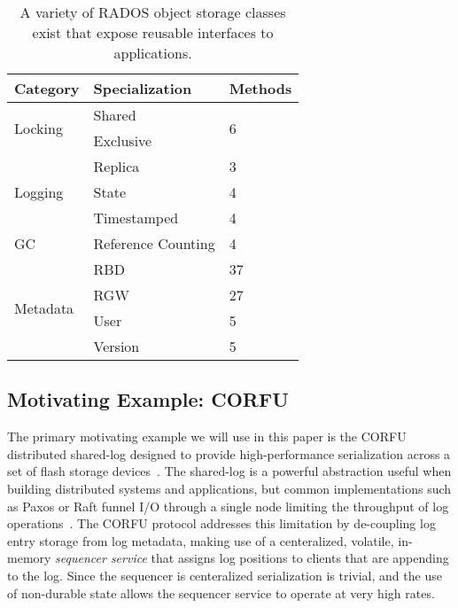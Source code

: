 \documentclass[10pt,twocolumn]{article}
\begin{document}
\begin{table}
\begin{tabular}{|l|l|l|}
\hline
Category & Specialization & Methods \\ \hline
\multirow{2}{*}{Locking} & Shared & \multirow{2}{*}{6} \\
                         & Exclusive & \\ \hline
\multirow{3}{*}{Logging} & Replica & 3 \\
                         & State & 4 \\
                         & Timestamped & 4 \\ \hline
GC & Reference Counting & 4 \\ \hline
\multirow{4}{*}{Metadata} & RBD & 37 \\
 & RGW & 27 \\
 & User & 5 \\
 & Version & 5 \\ \hline
\end{tabular}
\caption{A variety of RADOS object storage classes exist that expose reusable
interfaces to applications.}
\label{tab:objclass-cats}
\end{table}

\subsection{Motivating Example: CORFU}

The primary motivating example we will use in this paper is the CORFU
distributed shared-log designed to provide high-performance serialization
across a set of flash storage devices~\cite{balakrishnan:nsdi12}. The
shared-log is a powerful abstraction useful when building distributed systems
and applications, but common implementations such as Paxos or Raft funnel I/O
through a single node limiting the throughput of log
operations~\cite{lamport:tocs89}. The CORFU protocol addresses this limitation
by de-coupling log entry storage from log metadata, making use of a
centeralized, volatile, in-memory \emph{sequencer service} that assigns log
positions to clients that are appending to the log. Since the sequencer is
centeralized serialization is trivial, and the use of non-durable state allows
the sequencer service to operate at very high rates.
\end{document}
